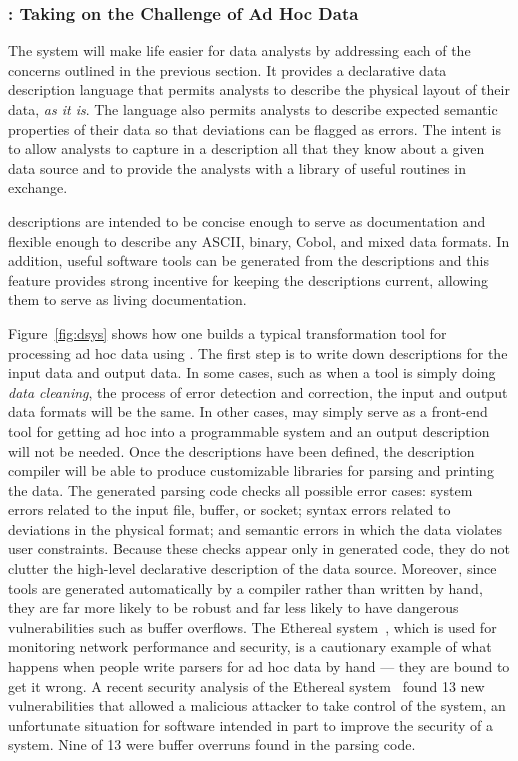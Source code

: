 \documentclass[11pt]{article}
\begin{document}
\subsubsection{\datatype{}:  Taking on the Challenge of Ad Hoc Data}

The \datatype{} system will make life easier for data analysts by addressing
each of the concerns outlined in the previous section.
It provides a declarative data description
language that permits analysts to describe the physical layout of
their data, \textit{as it is}.  The language also permits analysts to
describe expected semantic properties of their data so that deviations can
be flagged as errors. The intent is to allow analysts to capture in a
\datatype{} description all that they know about a given data source
and to provide the analysts with a library of useful routines in exchange. 

\datatype{} descriptions are intended to be concise enough to serve as
documentation and flexible enough to describe any ASCII, binary,
Cobol, and mixed data formats.  In addition, useful software tools
can be generated from the descriptions and this feature provides
strong incentive for keeping the descriptions current, allowing them
to serve as living documentation.  


Figure~\ref{fig:dsys} shows how one builds a typical transformation tool for
processing ad hoc data using \datatype{}.  The first step is to
write down \datatype{} descriptions for the input data and output
data.  In some cases, such as when a tool is simply doing {\em data cleaning},
the process of error detection
and correction, the input and output data formats will be the same.
In other cases, \datatype{} may simply serve as a front-end tool for getting ad hoc 
into a programmable system and an output description will not be needed.
Once the descriptions have been defined, the \datatype{} description compiler
will be able to produce
customizable libraries for parsing and printing the data.   
The generated parsing code checks
all possible error cases: system errors related to the input file,
buffer, or socket; syntax errors related to deviations in the physical
format; and semantic errors in which the data violates user
constraints.  Because these checks appear only in generated code, they
do not clutter the high-level declarative description of the data
source.  Moreover, since tools are generated
automatically by a compiler rather than written by hand, 
they are far more likely to be robust
and far less likely to have dangerous vulnerabilities such as
buffer overflows.  The Ethereal system~\cite{ethereal}, which is used for
monitoring network performance and security, is a cautionary example
of what happens when people write parsers for ad hoc data by hand --- they are
bound to get it wrong.  A recent security analysis of the Ethereal system~\cite{ethereal-attack}
found 13 new vulnerabilities that allowed a malicious attacker to take control
of the system, an unfortunate situation for software intended in part to
improve the security of a system. Nine of 13 were buffer overruns found in the parsing code.
\end{document}
